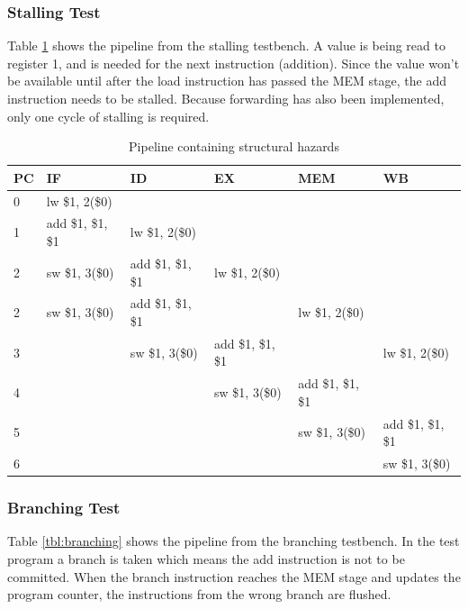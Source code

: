 \subsubsection{Stalling Test}
Table \ref{tbl:stalling} shows the pipeline from the stalling testbench.
A value is being read to register 1, and is needed for the next instruction (addition).
Since the value won't be available until after the load instruction has passed the MEM stage,
the add instruction needs to be stalled.
Because forwarding has also been implemented, only one cycle of stalling is required.
\begin{table}[h]
    \begin{tabular}{l|lllll}
    PC & IF                & ID                & EX                & MEM               & WB                \\ \hline
    0  & lw \$1, 2(\$0)    & ~                 & ~                 & ~                 & ~                 \\
    1  & add \$1, \$1, \$1 & lw \$1, 2(\$0)    & ~                 & ~                 & ~                 \\
    2  & sw \$1, 3(\$0)    & add \$1, \$1, \$1 & lw \$1, 2(\$0)    & ~                 & ~                 \\
    2  & sw \$1, 3(\$0)    & add \$1, \$1, \$1 & ~                 & lw \$1, 2(\$0)    & ~                 \\
    3  & ~                 & sw \$1, 3(\$0)    & add \$1, \$1, \$1 & ~                 & lw \$1, 2(\$0)    \\
    4  & ~                 & ~                 & sw \$1, 3(\$0)    & add \$1, \$1, \$1 & ~                 \\
    5  & ~                 & ~                 & ~                 & sw \$1, 3(\$0)    & add \$1, \$1, \$1 \\
    6  & ~                 & ~                 & ~                 & ~                 & sw \$1, 3(\$0)    \\
    \end{tabular}
\caption{Pipeline containing structural hazards}
\label{tbl:stalling}
\end{table}

\subsubsection{Branching Test}
Table \ref{tbl:branching} shows the pipeline from the branching testbench.
In the test program a branch is taken which means the add instruction is not to be committed.
When the branch instruction reaches the MEM stage and updates the program counter,
the instructions from the wrong branch are flushed.

